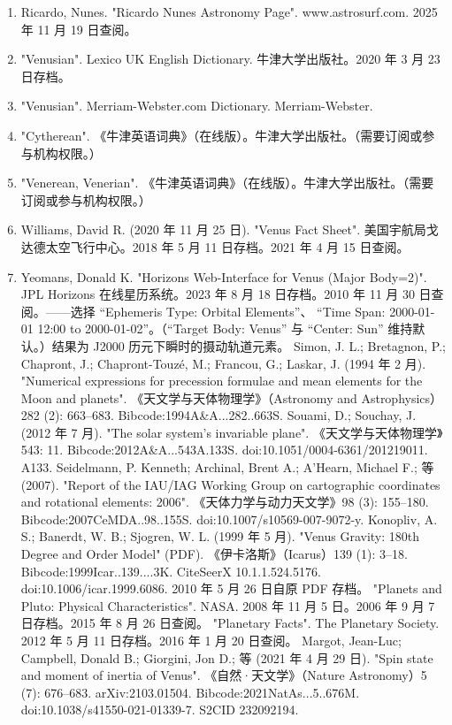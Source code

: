 \begin{enumerate}
\item Ricardo, Nunes. "Ricardo Nunes Astronomy Page". www.astrosurf.com. 2025 年 11 月 19 日查阅。  
\item "Venusian". Lexico UK English Dictionary. 牛津大学出版社。2020 年 3 月 23 日存档。  
\item "Venusian". Merriam-Webster.com Dictionary. Merriam-Webster.  
\item "Cytherean". 《牛津英语词典》（在线版）。牛津大学出版社。（需要订阅或参与机构权限。）  
\item "Venerean, Venerian". 《牛津英语词典》（在线版）。牛津大学出版社。（需要订阅或参与机构权限。）  
\item Williams, David R. (2020 年 11 月 25 日). "Venus Fact Sheet". 美国宇航局戈达德太空飞行中心。2018 年 5 月 11 日存档。2021 年 4 月 15 日查阅。  
\item Yeomans, Donald K. "Horizons Web-Interface for Venus (Major Body=2)". JPL Horizons 在线星历系统。2023 年 8 月 18 日存档。2010 年 11 月 30 日查阅。——选择 “Ephemeris Type: Orbital Elements”、 “Time Span: 2000-01-01 12:00 to 2000-01-02”。（“Target Body: Venus” 与 “Center: Sun” 维持默认。）结果为 J2000 历元下瞬时的摄动轨道元素。  
Simon, J. L.; Bretagnon, P.; Chapront, J.; Chapront-Touzé, M.; Francou, G.; Laskar, J. (1994 年 2 月). "Numerical expressions for precession formulae and mean elements for the Moon and planets". 《天文学与天体物理学》（Astronomy and Astrophysics）282 (2): 663–683. Bibcode:1994A&A...282..663S.  
Souami, D.; Souchay, J. (2012 年 7 月). "The solar system's invariable plane". 《天文学与天体物理学》543: 11. Bibcode:2012A&A...543A.133S. doi:10.1051/0004-6361/201219011. A133.  
Seidelmann, P. Kenneth; Archinal, Brent A.; A'Hearn, Michael F.; 等 (2007). "Report of the IAU/IAG Working Group on cartographic coordinates and rotational elements: 2006". 《天体力学与动力天文学》98 (3): 155–180. Bibcode:2007CeMDA..98..155S. doi:10.1007/s10569-007-9072-y.  
Konopliv, A. S.; Banerdt, W. B.; Sjogren, W. L. (1999 年 5 月). "Venus Gravity: 180th Degree and Order Model" (PDF). 《伊卡洛斯》（Icarus）139 (1): 3–18. Bibcode:1999Icar..139....3K. CiteSeerX 10.1.1.524.5176. doi:10.1006/icar.1999.6086. 2010 年 5 月 26 日自原 PDF 存档。  
"Planets and Pluto: Physical Characteristics". NASA. 2008 年 11 月 5 日。2006 年 9 月 7 日存档。2015 年 8 月 26 日查阅。  
"Planetary Facts". The Planetary Society. 2012 年 5 月 11 日存档。2016 年 1 月 20 日查阅。  
Margot, Jean-Luc; Campbell, Donald B.; Giorgini, Jon D.; 等 (2021 年 4 月 29 日). "Spin state and moment of inertia of Venus". 《自然·天文学》（Nature Astronomy）5 (7): 676–683. arXiv:2103.01504. Bibcode:2021NatAs...5..676M. doi:10.1038/s41550-021-01339-7. S2CID 232092194.  

\end{enumerate}
